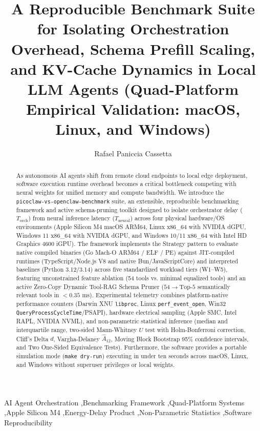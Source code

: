 \documentclass[preprint,12pt,3p]{elsarticle}
\begin{document}
\begin{frontmatter}

\title{A Reproducible Benchmark Suite for Isolating Orchestration Overhead, Schema Prefill Scaling, and KV-Cache Dynamics in Local LLM Agents (Quad-Platform Empirical Validation: macOS, Linux, and Windows)}

\author[ufabc]{Rafael Paniccia Cassetta}

\begin{abstract}
As autonomous AI agents shift from remote cloud endpoints to local edge deployment, software execution runtime overhead becomes a critical bottleneck competing with neural weights for unified memory and compute bandwidth. We introduce the \texttt{picoclaw-vs-openclaw-benchmark} suite, an extensible, reproducible benchmarking framework and active schema-pruning toolkit designed to isolate orchestrator delay ($T_{\text{orch}}$) from neural inference latency ($T_{\text{neural}}$) across four physical hardware/OS environments (Apple Silicon M4 macOS ARM64, Linux x86\_64 with NVIDIA dGPU, Windows 11 x86\_64 with NVIDIA dGPU, and Windows 10/11 x86\_64 with Intel HD Graphics 4600 iGPU). The framework implements the Strategy pattern to evaluate native compiled binaries (Go Mach-O ARM64 / ELF / PE) against JIT-compiled runtimes (TypeScript/Node.js V8 and native Bun/JavaScriptCore) and interpreted baselines (Python 3.12/3.14) across five standardized workload tiers (W1--W5), featuring unconstrained feature ablation (54 tools vs. minimal equalized tools) and an active Zero-Copy Dynamic Tool-RAG Schema Pruner ($54 \rightarrow \text{Top-}5$ semantically relevant tools in $<0.35\text{ ms}$). Experimental telemetry combines platform-native performance counters (Darwin XNU \texttt{libproc}, Linux \texttt{perf\_event\_open}, Win32 \texttt{QueryProcessCycleTime}/PSAPI), hardware electrical sampling (Apple SMC, Intel RAPL, NVIDIA NVML), and non-parametric statistical inference (median and interquartile range, two-sided Mann-Whitney $U$ test with Holm-Bonferroni correction, Cliff's Delta $d$, Vargha-Delaney $\hat{A}_{12}$, Moving Block Bootstrap 95\% confidence intervals, and Two One-Sided Equivalence Tests). Furthermore, the software provides a portable simulation mode (\texttt{make dry-run}) executing in under ten seconds across macOS, Linux, and Windows without superuser privileges or local weights.
\end{abstract}

\begin{keyword}
AI Agent Orchestration \sep Benchmarking Framework \sep Quad-Platform Systems \sep Apple Silicon M4 \sep Energy-Delay Product \sep Non-Parametric Statistics \sep Software Reproducibility
\end{keyword}

\end{frontmatter}
\end{document}

